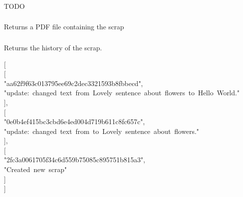 \documentclass[onecolumn, draftclsnofoot, 10pt, compsoc]{IEEEtran}
\begin{document}
\subsubsection{}\label{sec-post-scrapsauthoruuidfork}%

\noindent TODO%

\subsubsection{}\label{sec-get-scrapsauthoruuidpdf}%

\noindent Returns a PDF file containing the scrap%

\subsubsection{}\label{sec-get-scrapsauthoruuidhistory}%

\noindent Returns the history of the scrap.%
\begin{mdpre}%
\noindent{}[\\
[\\
"aa62f9f63c013795ee69c2dec3321593b8fbbecd",\\
"update:~changed~text~from~Lovely~sentence~about~flowers~to~Hello~World."\\
],\\
[\\
"0e0b4ef415bc3cbd6e4ed004d719b611c8fc657c",\\
"update:~changed~text~from~to~Lovely~sentence~about~flowers."\\
],\\
[\\
"2fc3a0061705f34c6d559b75085c895751b815a3",\\
"Created~new~scrap"\\
]\\
]%
\end{mdpre}
\subsubsection{}\label{sec-post-scrapsnew}%
\end{document}
